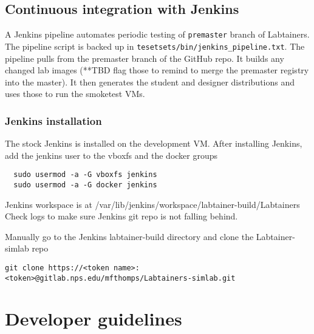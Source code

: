 \documentclass[12pt]{article}
\begin{document}
\subsection{Continuous integration with Jenkins}
A Jenkins pipeline automates periodic testing of {\tt premaster} branch of Labtainers.  The pipeline script is backed up in
{\tt tesetsets/bin/jenkins\_pipeline.txt}.   The pipeline pulls from the premaster branch of the GitHub repo.  It builds any
changed lab images (**TBD flag those to remind to merge the premaster registry into the master).  It then generates the
student and designer distributions and uses those to run the smoketest VMs.

\subsubsection{Jenkins installation}
The stock Jenkins is installed on the development VM.
After installing Jenkins, add the jenkins user to the vboxfs and the docker groups
\begin{verbatim}
  sudo usermod -a -G vboxfs jenkins
  sudo usermod -a -G docker jenkins
\end{verbatim}

Jenkins workspace is at /var/lib/jenkins/workspace/labtainer-build/Labtainers
Check logs to make sure Jenkins git repo is not falling behind.

Manually go to the Jenkins labtainer-build directory and clone the Labtainer-simlab repo
\begin{verbatim}
git clone https://<token name>:<token>@gitlab.nps.edu/mfthomps/Labtainers-simlab.git
\end{verbatim}

\section{Developer guidelines}
\end{document}
